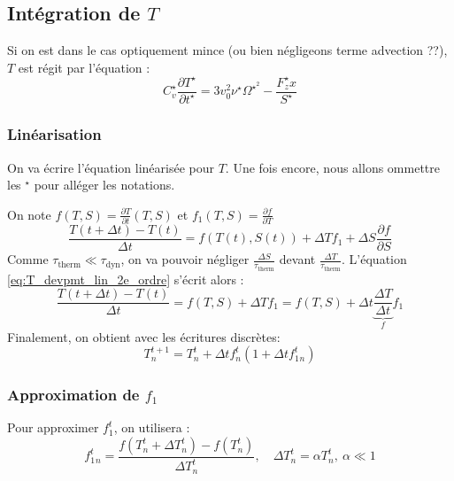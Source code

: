 \subsection{Intégration de $T$}
\label{subsec:integration_T}

Si on est dans le cas optiquement mince (ou bien négligeons terme advection ??), $T$ est régit par l'équation :
\begin{equation}
  C_v^\star \frac{\partial T^\star}{\partial t^\star} = 3v_0^2\nu^\star \Omega^\star^2 - \frac{F_z^\star x}{S^\star}
\end{equation}

\subsubsection{Linéarisation}
On va écrire l'équation linéarisée pour $T$. Une fois encore, nous allons ommettre les ${}^\star$ pour alléger les notations.

On note $f(T, S) = \frac{\partial T}{\partial t}(T, S)$ et $f_1(T, S) = \frac{\partial f}{\partial T}$
\begin{equation}
  \label{eq:T_devpmt_lin_2e_ordre} 
  \frac{T(t+\Delta t) - T(t)}{\Delta t} = f(T(t), S(t)) + \Delta Tf_1 + \Delta S\frac{\partial f}{\partial S}
\end{equation}
Comme $\tau_\textrm{therm} \ll \tau_\textrm{dyn}$, on va pouvoir négliger $\frac{\Delta S}{\tau_\textrm{therm}}$ devant $\frac{\Delta T}{\tau_\textrm{therm}}$. L'équation \eqref{eq:T_devpmt_lin_2e_ordre} s'écrit alors :
\begin{equation}
  \frac{T(t+\Delta t) - T(t)}{\Delta t} = f(T, S) + \Delta T f_1 = f(T, S) + \Delta t \underbrace{\frac{\Delta T}{\Delta t}}_{f} f_1
\end{equation}
Finalement, on obtient avec les écritures discrètes:
\begin{equation}
  T^{t+1}_n = T^{t}_n + \Delta t f^t_n \left(1 + \Delta t f_1^t_n\right)
\end{equation}

\subsubsection{Approximation de $f_1$}
Pour approximer $f_1^t$, on utilisera :
\begin{equation}
  f_1^t_n = \frac{f(T_n^t+\Delta T_n^t) - f(T_n^t)}{\Delta T_n^t}, \quad \Delta T_n^t = \alpha T_n^t,\ \alpha \ll 1
\end{equation}
